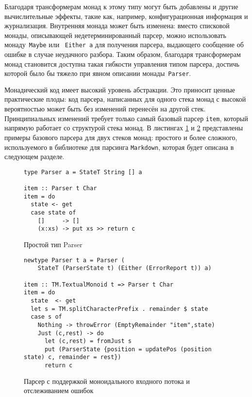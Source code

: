 Благодаря трансформерам монад к этому типу могут быть добавлены и другие вычислительные эффекты, такие как, например, конфигурационная информация и журнализация. Внутренняя монада может быть изменена: вместо списковой монады, описывающей недетерминированный парсер, можно использовать монаду~\lstinline{Maybe} или ~\lstinline{Either a} для получения парсера, выдающего сообщение об ошибке в случае неудачного разбора. Таким образом, благодаря трансформерам монад становится доступна такая гибкости управления типом парсера, достичь которой было бы тяжело при явном описании монады~\lstinline{Parser}.

Монадический код имеет высокий уровень абстракции. Это приносит ценные практические плоды: код парсера, написанных для одного стека монад с высокой вероятностью может быть без изменений перенесён на другой стек. Принципиальных изменений требует только самый базовый парсер \lstinline{item}, который напрямую работает со структурой стека монад. В листингах \ref{listing:MonadTransItem1} и \ref{listing:MonadTransItem2} представлены примеры базового парсера для двух стеков монад: простого и более сложного, используемого в библиотеке для парсинга \lstinline{Markdown}, которая будет описана в следующем разделе.  

\begin{figure}[t]
\begin{lstlisting}
type Parser a = StateT String [] a

item :: Parser t Char
item = do
  state <- get
  case state of
    []     -> []
    (x:xs) -> put xs >> return c  
\end{lstlisting}
\caption{Простой тип Parser}
\label{listing:MonadTransItem1}
\end{figure}

\begin{figure}[t]
\begin{lstlisting}
newtype Parser t a = Parser (  
    StateT (ParserState t) (Either (ErrorReport t)) a)

item :: TM.TextualMonoid t => Parser t Char
item = do
  state  <- get
  let s = TM.splitCharacterPrefix . remainder $ state
  case s of 
    Nothing -> throwError (EmptyRemainder "item",state)
    Just (c,rest) -> do  
      let (c,rest) = fromJust s
      put (ParserState {position = updatePos (position state) c, remainder = rest})
      return c
\end{lstlisting}
\caption{Парсер с поддержкой моноидального входного потока и отслеживанием ошибок}
\label{listing:MonadTransItem2}
\end{figure}

